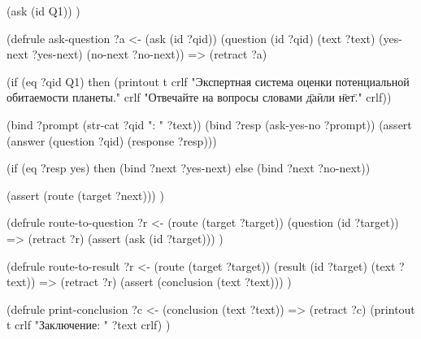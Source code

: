 \documentclass[14pt,a4paper]{extarticle}
\begin{document}
\begin{Code}
  (ask (id Q1))
)

(defrule ask-question
  ?a <- (ask (id ?qid))
  (question (id ?qid) (text ?text) (yes-next ?yes-next) (no-next ?no-next))
  =>
  (retract ?a)

  (if (eq ?qid Q1)
    then
    (printout t crlf
      "Экспертная система оценки потенциальной обитаемости планеты." crlf
      "Отвечайте на вопросы словами \"да\" или \"нет\"." crlf))

  (bind ?prompt (str-cat ?qid ": " ?text))
  (bind ?resp (ask-yes-no ?prompt))
  (assert (answer (question ?qid) (response ?resp)))

  (if (eq ?resp yes)
    then
    (bind ?next ?yes-next)
    else
    (bind ?next ?no-next))

  (assert (route (target ?next)))
)

(defrule route-to-question
  ?r <- (route (target ?target))
  (question (id ?target))
  =>
  (retract ?r)
  (assert (ask (id ?target)))
)

(defrule route-to-result
  ?r <- (route (target ?target))
  (result (id ?target) (text ?text))
  =>
  (retract ?r)
  (assert (conclusion (text ?text)))
)

(defrule print-conclusion
  ?c <- (conclusion (text ?text))
  =>
  (retract ?c)
  (printout t crlf "Заключение: " ?text crlf)
)
\end{Code}
\end{document}

